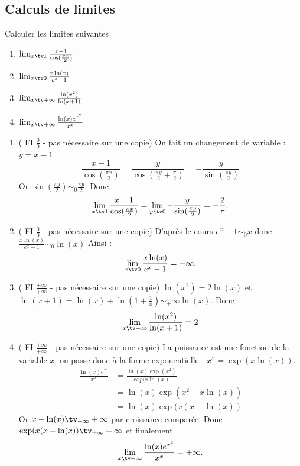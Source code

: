 \subsection{Calculs de limites}

\begin{exercice}
Calculer les limites suivantes 
\begin{enumerate}
\item $\lim_{x\tv 1} \frac{x-1}{\cos(\frac{\pi x}{2})}$
\item $\lim_{x\tv 0} \frac{x\ln(x)}{e^x-1}$
\item $\lim_{x\tv +\infty} \frac{\ln(x^2)}{\ln(x+1)}$
\item $\lim_{x\tv +\infty} \frac{\ln(x) e^{x^2}}{x^x}$
\end{enumerate}
\end{exercice}
\begin{correction}
\begin{enumerate}
\item  ( FI $\frac{0}{0}$ - pas nécessaire sur une copie) 
On fait un changement de variable : $y=x-1$.
$$\frac{x-1}{\cos(\frac{\pi x}{2})} = \frac{y}{\cos(\frac{\pi y}{2}+\frac{\pi}{2})}=-\frac{y}{\sin(\frac{\pi y}{2})}$$
Or $\sin(\frac{\pi y}{2})\sim_0 \frac{\pi y}{2}$. Donc 
$$\lim_{x\tv 1} \frac{x-1}{\cos(\frac{\pi x}{2})} = \lim_{y\tv 0} -\frac{y}{\sin(\frac{\pi y}{2})}= -\frac{2}{\pi}.$$
\item  ( FI $\frac{0}{0}$ - pas nécessaire sur une copie) 
D'après le cours $e^x-1\sim_0 x$ donc $ \frac{x\ln(x)}{e^x-1} \sim_0 \ln(x)$
Ainsi : $$\lim_{x\tv 0} \frac{x\ln(x)}{e^x-1}=-\infty.$$
\item  ( FI $\frac{+\infty}{+\infty}$ - pas nécessaire sur une copie) 
$\ln(x^2)= 2\ln(x)$ et  $\ln(x+1) = \ln(x) + \ln\left( 1+\frac{1}{x}\right)\sim_+\infty \ln(x)$. Donc 
$$\lim_{x\tv +\infty} \frac{\ln(x^2)}{\ln(x+1)}=2$$
\item  ( FI $\frac{+\infty}{+\infty}$ - pas nécessaire sur une copie) 
La puissance est une fonction de la variable $x$, on passe donc à la forme exponentielle : $x^x =\exp(x\ln(x))$.
\begin{align*}
\frac{\ln(x) e^{x^2}}{x^x }&= \frac{\ln(x) \exp(x^2)}{exp(x\ln(x)} \\
&= \ln(x) \exp(x^2-x\ln(x))\\ 
&=\ln(x) \exp(x(x-\ln(x))
\end{align*}
Or $x-\ln(x) \tv_{+\infty} +\infty$ par croissance comparée. Donc $\exp(x(x-\ln(x))\tv_{+\infty} +\infty$  et finalement 
$$\lim_{x\tv +\infty} \frac{\ln(x) e^{x^2}}{x^x} =+\infty.$$

\end{enumerate}

\end{correction}







